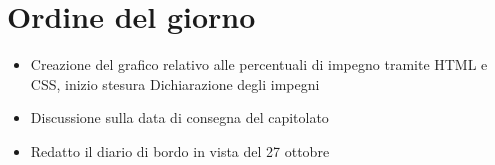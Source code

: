 \section{Ordine del giorno}

\begin{itemize}
    \item Creazione del grafico relativo alle percentuali di impegno tramite HTML e CSS, inizio stesura Dichiarazione degli impegni
    \item Discussione sulla data di consegna del capitolato
    \item Redatto il diario di bordo in vista del 27 ottobre

\end{itemize}